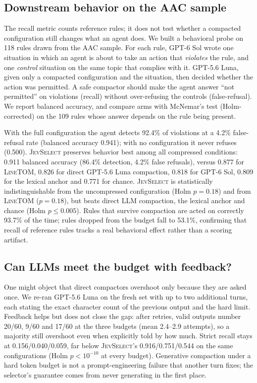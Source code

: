 \documentclass[11pt,a4paper]{article}
\newcommand{\sel}{\textsc{JevSelect}}
\newcommand{\linetom}{\textsc{LineTOM}}
\begin{document}
\subsection{Downstream behavior on the AAC sample}\label{sec:aac}
The recall metric counts reference rules; it does not test whether a compacted configuration still changes what an agent does. We built a behavioral probe on 118 rules drawn from the AAC sample. For each rule, GPT-6 Sol wrote one situation in which an agent is about to take an action that \emph{violates} the rule, and one \emph{control} situation on the same topic that complies with it. GPT-5.6 Luna, given only a compacted configuration and the situation, then decided whether the action was permitted. A safe compactor should make the agent answer ``not permitted'' on violations (recall) without over-refusing the controls (false-refusal). We report balanced accuracy, and compare arms with McNemar's test (Holm-corrected) on the 109 rules whose answer depends on the rule being present.

With the full configuration the agent detects 92.4\% of violations at a 4.2\% false-refusal rate (balanced accuracy 0.941); with no configuration it never refuses (0.500). \sel{} preserves behavior best among all compressed conditions: 0.911 balanced accuracy (86.4\% detection, 4.2\% false refusals), versus 0.877 for \linetom{}, 0.826 for direct GPT-5.6 Luna compaction, 0.818 for GPT-6 Sol, 0.809 for the lexical anchor and 0.771 for chance. \sel{} is statistically indistinguishable from the uncompressed configuration (Holm $p=0.18$) and from \linetom{} ($p=0.18$), but beats direct LLM compaction, the lexical anchor and chance ($\text{Holm } p\le0.005$). Rules that survive compaction are acted on correctly 93.7\% of the time; rules dropped from the budget fall to 53.1\%, confirming that recall of reference rules tracks a real behavioral effect rather than a scoring artifact.

\subsection{Can LLMs meet the budget with feedback?}\label{sec:retry}
One might object that direct compactors overshoot only because they are asked once. We re-ran GPT-5.6 Luna on the fresh set with up to two additional turns, each stating the exact character count of the previous output and the hard limit. Feedback helps but does not close the gap: after retries, valid outputs number 20/60, 9/60 and 17/60 at the three budgets (mean 2.4--2.9 attempts), so a majority still overshoot even when explicitly told by how much. Strict recall stays at 0.156/0.040/0.059, far below \sel{}'s 0.916/0.751/0.544 on the same configurations (Holm $p<10^{-10}$ at every budget). Generative compaction under a hard token budget is not a prompt-engineering failure that another turn fixes; the selector's guarantee comes from never generating in the first place.
\end{document}
